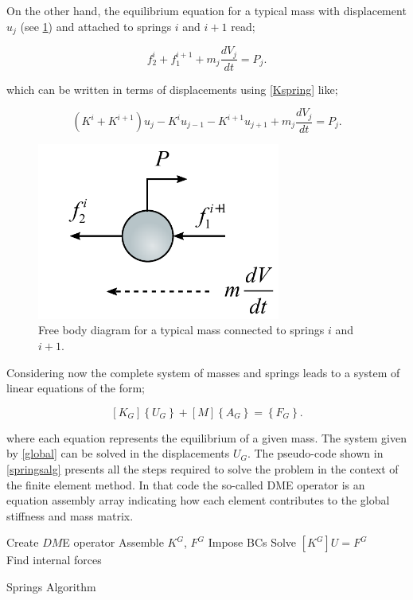 On the other hand, the equilibrium equation for a typical mass with displacement $u_j$  (see \cref{fig:dclmass}) and attached to springs $i$ and $i+1$ read;

\begin{equation}
f_2^i + f_1^{i + 1} + {m_j}\frac{{d{V_j}}}{{dt}} = {P_j}.
\label{equilmass}
\end{equation}

which can be written in terms of displacements using \cref{Kspring} like;

\[({K^i} + {K^{i + 1}}){u_j} - {K^i}{u_{j - 1}} - {K^{i + 1}}{u_{j + 1}} + {m_j}\frac{{d{V_j}}}{{dt}} = {P_j}.\]


\begin{figure}[H]
\centering
\includegraphics[width=8cm]{dcl_mass.pdf}
\caption{Free body diagram for a typical mass connected to springs $i$ and $i+1$.}
\label{fig:dclmass}
\end{figure}

Considering now the complete system of masses and springs leads to a system of linear equations of the form;

\begin{equation}
\left[ {{K_G}} \right]\left\{ {{U_G}} \right\} + \left[ M \right]\left\{ {{A_G}} \right\} = \left\{ {{F_G}} \right\}.
\label{global}
\end{equation}

where each equation represents the equilibrium of a given mass. The system given by \cref{global} can be solved in the displacements $U_G$. The pseudo-code shown in \cref{springsalg} presents all the steps required to solve the problem in the context of the finite element method. In that code the so-called DME operator is an equation assembly array indicating how each element contributes to the global stiffness and mass matrix.


\begin{algorithm}[H]
 \SetAlgoLined
 Create $DM$E operator\;
 Assemble $K^G$, $F^G$\;
Impose BCs\;
Solve $[K^G]U=F^G$\\
Find internal forces
\caption{Springs Algorithm}
\label{springsalg}
\end{algorithm}


